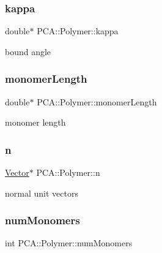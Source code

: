 \subsubsection{\texorpdfstring{kappa}{kappa}}
{\footnotesize\ttfamily double$\ast$ P\+C\+A\+::\+Polymer\+::kappa\hspace{0.3cm}{\ttfamily [protected]}}



bound angle 

\hypertarget{class_p_c_a_1_1_polymer_adec33c5274834c85479abefe537efa5a}{}\label{class_p_c_a_1_1_polymer_adec33c5274834c85479abefe537efa5a} 
\subsubsection{\texorpdfstring{monomer\+Length}{monomerLength}}
{\footnotesize\ttfamily double$\ast$ P\+C\+A\+::\+Polymer\+::monomer\+Length\hspace{0.3cm}{\ttfamily [protected]}}



monomer length 

\hypertarget{class_p_c_a_1_1_polymer_a7c71d8f5516ae0b0ead3929296135d1b}{}\label{class_p_c_a_1_1_polymer_a7c71d8f5516ae0b0ead3929296135d1b} 
\subsubsection{\texorpdfstring{n}{n}}
{\footnotesize\ttfamily \hyperlink{class_p_c_a_1_1_vector}{Vector}$\ast$ P\+C\+A\+::\+Polymer\+::n\hspace{0.3cm}{\ttfamily [protected]}}



normal unit vectors 

\hypertarget{class_p_c_a_1_1_polymer_a8dadd2d6d6d65b79909f274acd63fd1e}{}\label{class_p_c_a_1_1_polymer_a8dadd2d6d6d65b79909f274acd63fd1e} 
\subsubsection{\texorpdfstring{num\+Monomers}{numMonomers}}
{\footnotesize\ttfamily int P\+C\+A\+::\+Polymer\+::num\+Monomers\hspace{0.3cm}{\ttfamily [protected]}}



